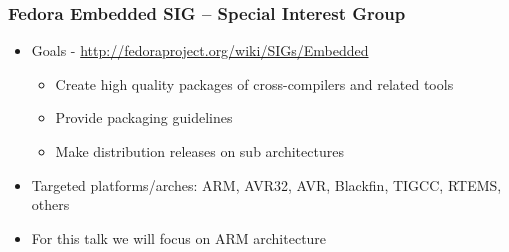 \documentclass[11pt]{beamer}
\begin{document}
\begin{frame}[fragile]\frametitle{Fedora Embedded SIG – Special Interest Group}
\label{sec-2.1}

\begin{itemize}

\item Goals - \href{http://fedoraproject.org/wiki/SIGs/Embedded}{http://fedoraproject.org/wiki/SIGs/Embedded}\\
\label{sec-2.1.1}

\begin{itemize}

\item Create high quality packages of cross-compilers and related tools\\
\label{sec-2.1.1.1}


\item Provide packaging guidelines\\
\label{sec-2.1.1.2}


\item Make distribution releases on sub architectures\\
\label{sec-2.1.1.3}

\end{itemize} %

\item Targeted platforms/arches: ARM, AVR32, AVR, Blackfin, TIGCC, RTEMS, others\\
\label{sec-2.1.2}


\item For this talk we will focus on ARM architecture\\
\label{sec-2.1.3}


\end{itemize} %
\end{frame}
\end{document}
